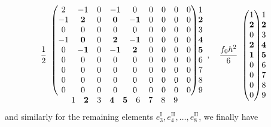 \[\frac12\begin{array}{c@{}c}
\begin{pmatrix}
2&-1&0&-1&0&0&0&0&0\\
-1&\mathbf2&0&\mathbf0&\mathbf{-1}&0&0&0&0\\
0&0&0&0&0&0&0&0&0\\
-1&\mathbf0&0&\mathbf2&\mathbf{-1}&0&0&0&0\\
0&\mathbf{-1}&0&\mathbf{-1}&\mathbf2&0&0&0&0\\
0&0&0&0&0&0&0&0&0\\0&0&0&0&0&0&0&0&0\\0&0&0&0&0&0&0&0&0\\0&0&0&0&0&0&0&0&0
\end{pmatrix}&\begin{matrix}1\\\mathbf2\\3\\\mathbf4\\\mathbf5\\6\\7\\8\\9\end{matrix}\\
\begin{matrix}1&\mathbf2&3&\mathbf4&\mathbf5&6&7&8&9\end{matrix}&
\end{array},\quad\frac{f_0h^2}{6}\begin{array}{c@{}c}
\begin{pmatrix}1\\\mathbf2\\0\\\mathbf2\\\mathbf1\\0\\0\\0\\0\end{pmatrix}&\begin{matrix}1\\\mathbf2\\3\\\mathbf4\\\mathbf5\\6\\7\\8\\9\end{matrix}
\end{array}\]
{and similarly for the remaining elements $e_3^{\mathrm I},e_4^{\mathrm {II}},\ldots,e_8^{\mathrm {II}}$, we finally have}
